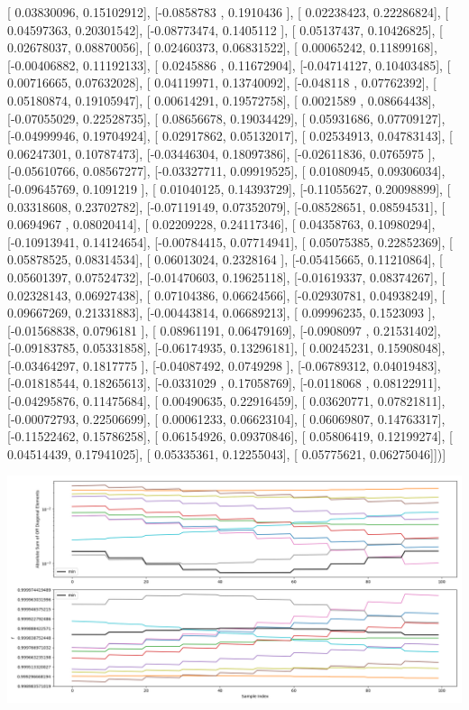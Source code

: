 \documentclass{article}
\begin{document}
       [ 0.03830096,  0.15102912],
       [-0.0858783 ,  0.1910436 ],
       [ 0.02238423,  0.22286824],
       [ 0.04597363,  0.20301542],
       [-0.08773474,  0.1405112 ],
       [ 0.05137437,  0.10426825],
       [ 0.02678037,  0.08870056],
       [ 0.02460373,  0.06831522],
       [ 0.00065242,  0.11899168],
       [-0.00406882,  0.11192133],
       [ 0.0245886 ,  0.11672904],
       [-0.04714127,  0.10403485],
       [ 0.00716665,  0.07632028],
       [ 0.04119971,  0.13740092],
       [-0.048118  ,  0.07762392],
       [ 0.05180874,  0.19105947],
       [ 0.00614291,  0.19572758],
       [ 0.0021589 ,  0.08664438],
       [-0.07055029,  0.22528735],
       [ 0.08656678,  0.19034429],
       [ 0.05931686,  0.07709127],
       [-0.04999946,  0.19704924],
       [ 0.02917862,  0.05132017],
       [ 0.02534913,  0.04783143],
       [ 0.06247301,  0.10787473],
       [-0.03446304,  0.18097386],
       [-0.02611836,  0.0765975 ],
       [-0.05610766,  0.08567277],
       [-0.03327711,  0.09919525],
       [ 0.01080945,  0.09306034],
       [-0.09645769,  0.1091219 ],
       [ 0.01040125,  0.14393729],
       [-0.11055627,  0.20098899],
       [ 0.03318608,  0.23702782],
       [-0.07119149,  0.07352079],
       [-0.08528651,  0.08594531],
       [ 0.0694967 ,  0.08020414],
       [ 0.02209228,  0.24117346],
       [ 0.04358763,  0.10980294],
       [-0.10913941,  0.14124654],
       [-0.00784415,  0.07714941],
       [ 0.05075385,  0.22852369],
       [ 0.05878525,  0.08314534],
       [ 0.06013024,  0.2328164 ],
       [-0.05415665,  0.11210864],
       [ 0.05601397,  0.07524732],
       [-0.01470603,  0.19625118],
       [-0.01619337,  0.08374267],
       [ 0.02328143,  0.06927438],
       [ 0.07104386,  0.06624566],
       [-0.02930781,  0.04938249],
       [ 0.09667269,  0.21331883],
       [-0.00443814,  0.06689213],
       [ 0.09996235,  0.1523093 ],
       [-0.01568838,  0.0796181 ],
       [ 0.08961191,  0.06479169],
       [-0.0908097 ,  0.21531402],
       [-0.09183785,  0.05331858],
       [-0.06174935,  0.13296181],
       [ 0.00245231,  0.15908048],
       [-0.03464297,  0.1817775 ],
       [-0.04087492,  0.0749298 ],
       [-0.06789312,  0.04019483],
       [-0.01818544,  0.18265613],
       [-0.0331029 ,  0.17058769],
       [-0.0118068 ,  0.08122911],
       [-0.04295876,  0.11475684],
       [ 0.00490635,  0.22916459],
       [ 0.03620771,  0.07821811],
       [-0.00072793,  0.22506699],
       [ 0.00061233,  0.06623104],
       [ 0.06069807,  0.14763317],
       [-0.11522462,  0.15786258],
       [ 0.06154926,  0.09370846],
       [ 0.05806419,  0.12199274],
       [ 0.04514439,  0.17941025],
       [ 0.05335361,  0.12255043],
       [ 0.05775621,  0.06275046]])]
\begin{center}
\includegraphics[scale=.9]{report_pickled_controls132/control_dpn_all.png}

\end{center}
\end{document}
